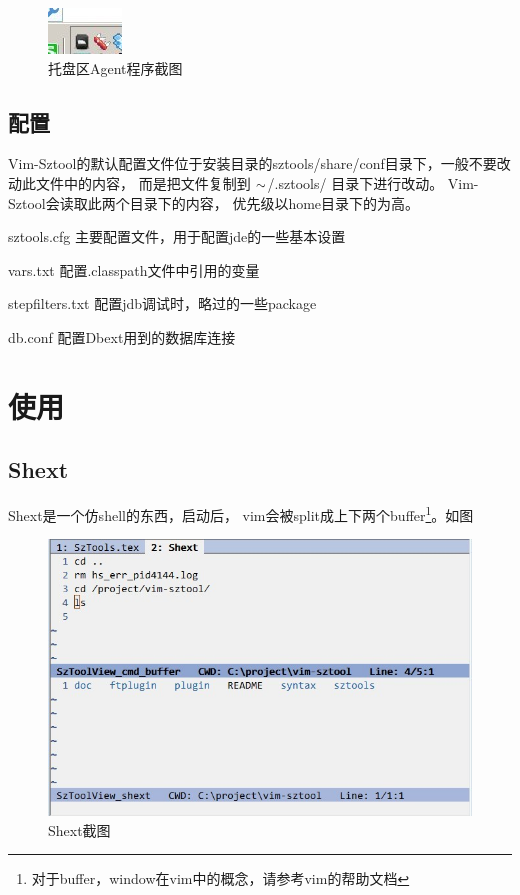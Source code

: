 \documentclass[oneside,openany]{book}
\begin{document}
   \begin{figure}[htbp]%
      \centering
      \includegraphics[scale=0.8]{tray.jpg}
      \caption{托盘区Agent程序截图}
  \end{figure}

  \section{配置}
    Vim-Sztool的默认配置文件位于安装目录的sztools/share/conf目录下，一般不要改动此文件中的内容，
  而是把文件复制到 $\tiny{\sim}$/.sztools/ 目录下进行改动。 Vim-Sztool会读取此两个目录下的内容，
  优先级以home目录下的为高。
  \begin{description}
    \item{sztools.cfg} 主要配置文件，用于配置jde的一些基本设置
    \item{vars.txt} 配置.classpath文件中引用的变量
    \item{stepfilters.txt} 配置jdb调试时，略过的一些package
    \item{db.conf} 配置Dbext用到的数据库连接
  \end{description}
  

\chapter{使用}
  \section{Shext}
  Shext是一个仿shell的东西，启动后， vim会被split成上下两个buffer\footnote{对于buffer，window在vim中的概念，请参考vim的帮助文档}。如图
  \begin{figure}[htbp]%
  \centering
  \includegraphics[scale=0.5]{shext.jpg}
  \caption{Shext截图}
  \end{figure}
  
\end{document}
